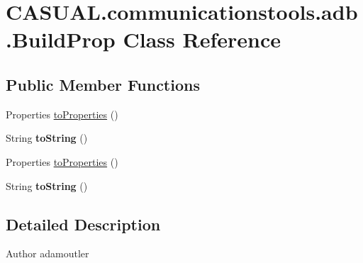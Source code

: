 \hypertarget{class_c_a_s_u_a_l_1_1communicationstools_1_1adb_1_1_build_prop}{\section{C\-A\-S\-U\-A\-L.\-communicationstools.\-adb.\-Build\-Prop Class Reference}
\label{class_c_a_s_u_a_l_1_1communicationstools_1_1adb_1_1_build_prop}
}
\subsection*{Public Member Functions}
\begin{DoxyCompactItemize}
\item 
Properties \hyperlink{class_c_a_s_u_a_l_1_1communicationstools_1_1adb_1_1_build_prop_add05ac4d9bee2a65083111d8e730dfe0}{to\-Properties} ()
\item 
\hypertarget{class_c_a_s_u_a_l_1_1communicationstools_1_1adb_1_1_build_prop_aebd70374ac1d6aaf834e971c6f1d0b46}{String {\bfseries to\-String} ()}\label{class_c_a_s_u_a_l_1_1communicationstools_1_1adb_1_1_build_prop_aebd70374ac1d6aaf834e971c6f1d0b46}

\item 
Properties \hyperlink{class_c_a_s_u_a_l_1_1communicationstools_1_1adb_1_1_build_prop_add05ac4d9bee2a65083111d8e730dfe0}{to\-Properties} ()
\item 
\hypertarget{class_c_a_s_u_a_l_1_1communicationstools_1_1adb_1_1_build_prop_aebd70374ac1d6aaf834e971c6f1d0b46}{String {\bfseries to\-String} ()}\label{class_c_a_s_u_a_l_1_1communicationstools_1_1adb_1_1_build_prop_aebd70374ac1d6aaf834e971c6f1d0b46}

\end{DoxyCompactItemize}


\subsection{Detailed Description}
\begin{DoxyAuthor}{Author}
adamoutler 
\end{DoxyAuthor}


